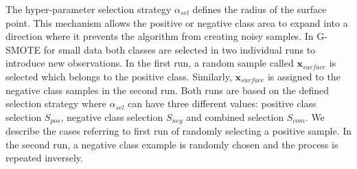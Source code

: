 \documentclass[parskip=full]{scrartcl}
\begin{document}
The hyper-parameter selection strategy \( \alpha_{sel} \) defines the radius of 
the surface point. This mechanism allows the positive or negative class area to 
expand into a direction where it prevents the algorithm from creating noisy 
samples. In G-SMOTE for small data both classes are selected in two individual 
runs to introduce new observations. In the first run, a random sample called 
\( \textbf{x}_{surface} \) is selected which belongs to the positive class. 
Similarly, \( \textbf{x}_{surface} \) is assigned to the negative class 
samples in the second run. Both runs are based on the defined selection 
strategy where \( \alpha_{sel} \) can have three different values: positive 
class selection \( S_{pos} \), negative class selection \( S_{neg} \) and 
combined selection \( S_{com} \). We describe the cases referring to first run 
of randomly selecting a positive sample. In the second run, a negative class 
example is randomly chosen and the process is repeated inversely. 
\end{document}
